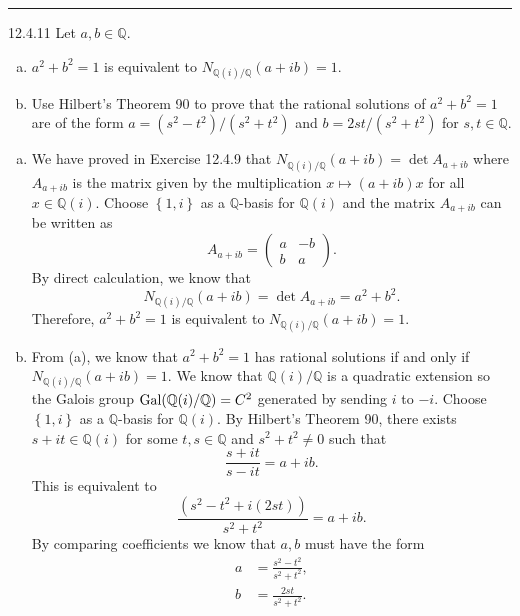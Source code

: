\documentclass[a4paper, 12pt]{article}
\begin{document}
\noindent\rule{7in}{2.8pt}
\begin{problem}{12.4.11}
Let \(a,b\in \mathbb{Q}\). 
\begin{enumerate}[(a)]
\item \(a^2+b^2=1\) is equivalent to \(N_{\mathbb{Q}(i)/\mathbb{Q}}(a+ib)=1\).
\item Use Hilbert's Theorem 90 to prove that the rational solutions of \(a^2+b^2=1\) are of the form \(a=(s^2-t^2)/(s^2+t^2)\) and \(b=2st/(s^2+t^2)\) for \(s,t\in \mathbb{Q}\).
\end{enumerate}
\end{problem}
\begin{solution}
\begin{enumerate}[(a)]
\item We have proved in Exercise 12.4.9 that \(N_{\mathbb{Q}(i)/\mathbb{Q}}(a+ib)=\det A_{a+ib}\) where \(A_{a+ib}\) is the matrix given by the multiplication \(x\mapsto (a+ib)x\) for all \(x\in \mathbb{Q}(i)\). Choose \(\left\{ 1,i \right\}\) as a \(\mathbb{Q}\)-basis for \(\mathbb{Q}(i)\) and the matrix \(A_{a+ib}\) can be written as 
\[A_{a+ib}=\begin{pmatrix}
   a & -b\\ 
   b & a
\end{pmatrix}.\]
By direct calculation, we know that 
\[N_{\mathbb{Q}(i)/\mathbb{Q}}(a+ib)=\det A_{a+ib}=a^2+b^2.\]
Therefore, \(a^2+b^2=1\) is equivalent to \(N_{\mathbb{Q}(i)/\mathbb{Q}}(a+ib)=1\).
\item From (a), we know that \(a^2+b^2=1\) has rational solutions if and only if \(N_{\mathbb{Q}(i)/\mathbb{Q}}(a+ib)=1\). We know that \(\mathbb{Q}(i)/\mathbb{Q}\) is a quadratic extension so the Galois group \(\text{Gal}(\mathbb{Q}(i)/\mathbb{Q})=C^2\) generated by sending \(i\) to \(-i\). Choose \(\left\{ 1,i \right\}\) as a \(\mathbb{Q}\)-basis for \(\mathbb{Q}(i)\). By Hilbert's Theorem 90, there exists \(s+it\in \mathbb{Q}(i)\) for some \(t,s\in \mathbb{Q}\) and \(s^2+t^2\neq 0\) such that 
\[\frac{s+it}{s-it}=a+ib.\]
This is equivalent to 
\[\frac{(s^2-t^2+i(2st))}{s^2+t^2}=a+ib.\]
By comparing coefficients we know that \(a, b\) must have the form 
\begin{align*}
    a&=\frac{s^2-t^2}{s^2+t^2},\\[5pt]
    b&=\frac{2st}{s^2+t^2}.
\end{align*} 
\end{enumerate}
\end{solution}
\end{document}
